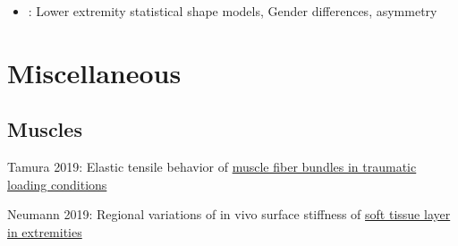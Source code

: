 \documentclass[]{book}
\providecommand{\tightlist}{%
  \setlength{\itemsep}{0pt}\setlength{\parskip}{0pt}}
\begin{document}
\begin{itemize}
\tightlist
\item
  \citet{Audenaert2019}: Lower extremity statistical shape models, Gender differences, asymmetry
\end{itemize}

\hypertarget{miscellaneous}{%
\chapter{Miscellaneous}\label{miscellaneous}}

\hypertarget{muscles}{%
\section{Muscles}\label{muscles}}

Tamura 2019: Elastic tensile behavior of \href{https://www.sciencedirect.com/science/article/pii/S0268003318307083}{muscle fiber bundles in traumatic loading conditions}

Neumann 2019: Regional variations of in vivo surface stiffness of \href{https://www.sciencedirect.com/science/article/pii/S0021929019305135?dgcid=raven_sd_aip_email}{soft tissue layer in extremities}


\end{document}

